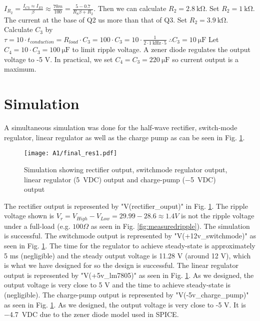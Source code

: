 $ I_{R_2} = \frac{I_{C3}\approx I_{E3}}{\beta}\approx\frac{70m}{100}=\frac{5-0.7}{R_8\beta+R_2} $. Then we can calculate $R_2=\SI{2.8}{\kilo \ohm}$. Set $R_2 = \SI{1}{\kilo \ohm}$.
The current at the base of Q2 us more than that of Q3. Set $R_2 = \SI{3.9}{\kilo \ohm}$.
Calculate $C_3$ by $\tau=10 \cdot t_{conduction}=R_{load} \cdot C_3=100 \cdot C_3=10 \cdot \frac{1}{2\cdot \SI{1}{\kilo \hertz}\cdot 5} \ \therefore C_3=\SI{10}{\micro \farad}$
Let $C_4=10 \cdot C_3=\SI{100}{\micro \farad}$ to limit ripple voltage. A zener diode regulates the output voltage to -5 V. In practical, we set $C_4=C_3=\SI{220}{\micro \farad}$ so current output is a maximum.

\section{Simulation} \label{sec:simulation_rectifier}

A simultaneous simulation was done for the half-wave rectifier, switch-mode regulator, linear regulator as well as the charge pump as can be seen in Fig. \ref{fig:allsignals}.

\begin{figure}[H]
    \centering
    \texttt{[image: A1/final\_res1.pdf]}
    \caption{Simulation showing rectifier output, switchmode regulator output, linear regulator (\SI{5}{VDC}) output and charge-pump (\SI{-5}{VDC}) output}
    \label{fig:allsignals}
\end{figure}

The rectifier output is represented by "V(rectifier\_ouput)" in Fig. \ref{fig:allsignals}. The ripple voltage shown is $V_r=V_{High}-V_{Low}=29.99-28.6 \approx 1.4 V$ is not the ripple voltage under a full-load (e.g. $100 \Omega$ as seen in Fig. \ref{fig:measuredripple}). The simulation is successful. The switchmode output is represented by "V(+12v\_switchmode)" as seen in Fig. \ref{fig:allsignals}. The time for the regulator to achieve steady-state is approximately 5 ms (negligible) and the steady output voltage is 11.28 V (around 12 V), which is what we have designed for so the design is successful. The linear regulator output is represented by "V(+5v\_lm7805)" as seen in Fig. \ref{fig:allsignals}. As we designed, the output voltage is very close to 5 V and the time to achieve steady-state is (negligible). The charge-pump output is represented by "V(-5v\_charge\_pump)" as seen in Fig. \ref{fig:allsignals}. As we designed, the output voltage is very close to -5 V. It is \SI{-4.7}{VDC} due to the zener diode model used in SPICE. 





